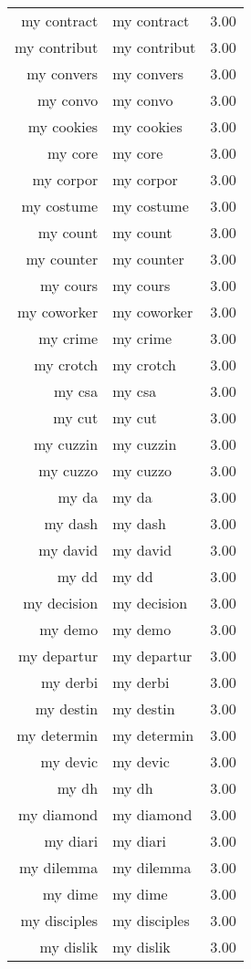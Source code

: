 \begin{table}[ht]
\begin{tabular}{rlr}
  my contract & my contract & 3.00 \\ 
  my contribut & my contribut & 3.00 \\ 
  my convers & my convers & 3.00 \\ 
  my convo & my convo & 3.00 \\ 
  my cookies & my cookies & 3.00 \\ 
  my core & my core & 3.00 \\ 
  my corpor & my corpor & 3.00 \\ 
  my costume & my costume & 3.00 \\ 
  my count & my count & 3.00 \\ 
  my counter & my counter & 3.00 \\ 
  my cours & my cours & 3.00 \\ 
  my coworker & my coworker & 3.00 \\ 
  my crime & my crime & 3.00 \\ 
  my crotch & my crotch & 3.00 \\ 
  my csa & my csa & 3.00 \\ 
  my cut & my cut & 3.00 \\ 
  my cuzzin & my cuzzin & 3.00 \\ 
  my cuzzo & my cuzzo & 3.00 \\ 
  my da & my da & 3.00 \\ 
  my dash & my dash & 3.00 \\ 
  my david & my david & 3.00 \\ 
  my dd & my dd & 3.00 \\ 
  my decision & my decision & 3.00 \\ 
  my demo & my demo & 3.00 \\ 
  my departur & my departur & 3.00 \\ 
  my derbi & my derbi & 3.00 \\ 
  my destin & my destin & 3.00 \\ 
  my determin & my determin & 3.00 \\ 
  my devic & my devic & 3.00 \\ 
  my dh & my dh & 3.00 \\ 
  my diamond & my diamond & 3.00 \\ 
  my diari & my diari & 3.00 \\ 
  my dilemma & my dilemma & 3.00 \\ 
  my dime & my dime & 3.00 \\ 
  my disciples & my disciples & 3.00 \\ 
  my dislik & my dislik & 3.00 \\ 

\end{tabular}
\end{table}
